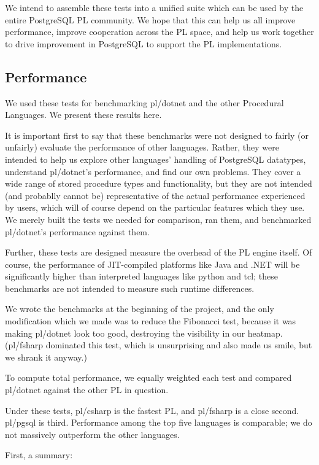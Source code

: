\documentclass[sigconf,techreport,authorversion,nonacm]{acmart}
\newcommand{\dotnet}{.NET }
\begin{document}
We intend to assemble these tests into a unified suite which can be
used by the entire PostgreSQL PL community. We hope that this can
help us all improve performance, improve cooperation across the PL
space, and help us work together to drive improvement in PostgreSQL
to support the PL implementations.

\subsection{Performance}

We used these tests for benchmarking pl/dotnet and the other
Procedural Languages. We present these results here.

It is important first to say that these benchmarks were not designed
to fairly (or unfairly) evaluate the performance of other languages.
Rather, they were intended to help us explore other languages'
handling of PostgreSQL datatypes, understand pl/dotnet's performance,
and find our own problems. They cover a wide range of stored
procedure types and functionality, but they are not intended (and
probablly cannot be) representative of the actual performance
experienced by users, which will of course depend on the particular
features which they use. We merely built the tests we needed for
comparison, ran them, and benchmarked pl/dotnet's performance against
them.

Further, these tests are designed measure the overhead of the PL engine
itself.  Of course, the performance of JIT-compiled platforms like Java
and \dotnet will be significantly higher than interpreted languages
like python and tcl; these benchmarks are not intended to measure such
runtime differences.

We wrote the benchmarks at the beginning of the project, and the only
modification which we made was to reduce the Fibonacci test, because
it was making pl/dotnet look too good, destroying the visibility in
our heatmap.  (pl/fsharp dominated this test, which is unsurprising and
also made us smile, but we shrank it anyway.)

To compute total performance, we equally weighted each test and
compared pl/dotnet against the other PL in question.

Under these tests, pl/csharp is the fastest PL, and pl/fsharp is a close
second.  pl/pgsql is third.  Performance among the top five languages
is comparable; we do not massively outperform the other languages.

First, a summary:
\end{document}
